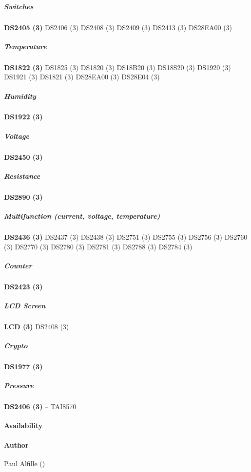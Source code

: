 \subparagraph*{Switches}\textsf{\textbf{DS2405 (3)} \textsf{DS2406 (3)} \textsf{DS2408 (3)} \textsf{DS2409 (3)} \textsf{DS2413 (3)} \textsf{DS28EA00
(3)}} 
\subparagraph*{Temperature}\textsf{\textbf{DS1822 (3)} \textsf{DS1825 (3)} \textsf{DS1820 (3)} \textsf{DS18B20 (3)} \textsf{DS18S20 (3)}
\textsf{DS1920 (3)} \textsf{DS1921 (3)} \textsf{DS1821 (3)} \textsf{DS28EA00 (3)} \textsf{DS28E04 (3)}} 
\subparagraph*{Humidity}\textsf{\textbf{DS1922
(3)}} 
\subparagraph*{Voltage}\textsf{\textbf{DS2450 (3)}} 
\subparagraph*{Resistance}\textsf{\textbf{DS2890 (3)}} 
\subparagraph*{Multifunction (current, voltage,
temperature)}\textsf{\textbf{DS2436 (3)} \textsf{DS2437 (3)} \textsf{DS2438 (3)} \textsf{DS2751 (3)} \textsf{DS2755 (3)} \textsf{DS2756
(3)} \textsf{DS2760 (3)} \textsf{DS2770 (3)} \textsf{DS2780 (3)} \textsf{DS2781 (3)} \textsf{DS2788 (3)} \textsf{DS2784 (3)}} 
\subparagraph*{Counter}\textsf{\textbf{DS2423
(3)}} 
\subparagraph*{LCD Screen}\textsf{\textbf{LCD (3)} \textsf{DS2408 (3)}} 
\subparagraph*{Crypto}\textsf{\textbf{DS1977 (3)}} 
\subparagraph*{Pressure}\textsf{\textbf{DS2406 (3)} -- TAI8570}
 
\paragraph*{Availability}
\paragraph*{Author}
Paul Alfille ()
